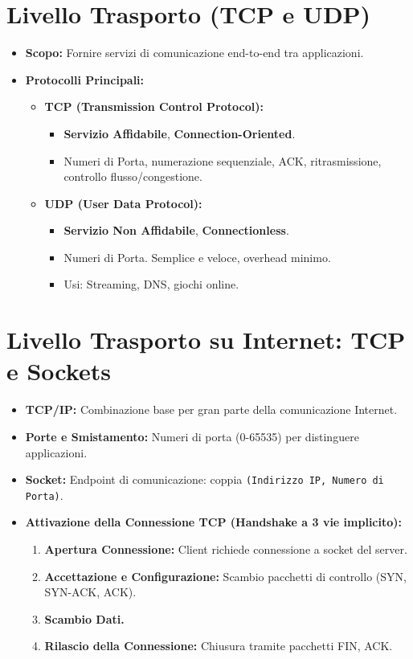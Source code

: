 \section{Livello Trasporto (TCP e UDP)}
\begin{itemize}
    \item \textbf{Scopo:} Fornire servizi di comunicazione end-to-end tra applicazioni.
    \item \textbf{Protocolli Principali:}
    \begin{itemize}
        \item \textbf{TCP (Transmission Control Protocol):}
        \begin{itemize}
            \item \textbf{Servizio Affidabile}, \textbf{Connection-Oriented}.
            \item Numeri di Porta, numerazione sequenziale, ACK, ritrasmissione, controllo flusso/congestione.
        \end{itemize}
        \item \textbf{UDP (User Data Protocol):}
        \begin{itemize}
            \item \textbf{Servizio Non Affidabile}, \textbf{Connectionless}.
            \item Numeri di Porta. Semplice e veloce, overhead minimo.
            \item Usi: Streaming, DNS, giochi online.
        \end{itemize}
    \end{itemize}
\end{itemize}

\section{Livello Trasporto su Internet: TCP e Sockets}
\begin{itemize}
    \item \textbf{TCP/IP:} Combinazione base per gran parte della comunicazione Internet.
    \item \textbf{Porte e Smistamento:} Numeri di porta (0-65535) per distinguere applicazioni.
    \item \textbf{Socket:} Endpoint di comunicazione: coppia \texttt{(Indirizzo IP, Numero di Porta)}.
    \item \textbf{Attivazione della Connessione TCP (Handshake a 3 vie implicito):}
    \begin{enumerate}
        \item \textbf{Apertura Connessione:} Client richiede connessione a socket del server.
        \item \textbf{Accettazione e Configurazione:} Scambio pacchetti di controllo (SYN, SYN-ACK, ACK).
        \item \textbf{Scambio Dati.}
        \item \textbf{Rilascio della Connessione:} Chiusura tramite pacchetti FIN, ACK.
    \end{enumerate}
\end{itemize}

